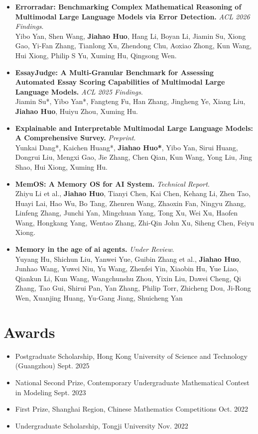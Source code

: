 \documentclass[letterpaper,10pt]{article}
\begin{document}
\begin{itemize}[leftmargin=0.15in, itemsep=1pt, parsep=0pt]
\item \textbf{Errorradar: Benchmarking Complex Mathematical Reasoning of Multimodal Large Language Models via Error Detection.} \emph{ACL 2026 Findings}. \\
  Yibo Yan, Shen Wang, \textbf{Jiahao Huo}, Hang Li, Boyan Li, Jiamin Su, Xiong Gao, Yi-Fan Zhang, Tianlong Xu, Zhendong Chu, Aoxiao Zhong, Kun Wang, Hui Xiong, Philip S Yu, Xuming Hu, Qingsong Wen.

  \item \textbf{EssayJudge: A Multi-Granular Benchmark for Assessing Automated Essay Scoring Capabilities of Multimodal Large Language Models.} \emph{ACL 2025 Findings}. \\
  Jiamin Su*, Yibo Yan*, Fangteng Fu, Han Zhang, Jingheng Ye, Xiang Liu, \textbf{Jiahao Huo}, Huiyu Zhou, Xuming Hu.

  \item \textbf{Explainable and Interpretable Multimodal Large Language Models: A Comprehensive Survey.} \emph{Preprint}. \\
  Yunkai Dang*, Kaichen Huang*, \textbf{Jiahao Huo*}, Yibo Yan, Sirui Huang, Dongrui Liu, Mengxi Gao, Jie Zhang, Chen Qian, Kun Wang, Yong Liu, Jing Shao, Hui Xiong, Xuming Hu.

  \item \textbf{MemOS: A Memory OS for AI System.} \emph{Technical Report}. \\
  Zhiyu Li et al., \textbf{Jiahao Huo}, Tianyi Chen, Kai Chen, Kehang Li, Zhen Tao, Huayi Lai, Hao Wu, Bo Tang, Zhenren Wang, Zhaoxin Fan, Ningyu Zhang, Linfeng Zhang, Junchi Yan, Mingchuan Yang, Tong Xu, Wei Xu, Haofen Wang, Hongkang Yang, Wentao Zhang, Zhi-Qin John Xu, Siheng Chen, Feiyu Xiong.

  \item \textbf{Memory in the age of ai agents.} \emph{Under Review}. \\
  Yuyang Hu, Shichun Liu, Yanwei Yue, Guibin Zhang et al., \textbf{Jiahao Huo}, Junhao Wang, Yuwei Niu, Yu Wang, Zhenfei Yin, Xiaobin Hu, Yue Liao, Qiankun Li, Kun Wang, Wangchunshu Zhou, Yixin Liu, Dawei Cheng, Qi Zhang, Tao Gui, Shirui Pan, Yan Zhang, Philip Torr, Zhicheng Dou, Ji-Rong Wen, Xuanjing Huang, Yu-Gang Jiang, Shuicheng Yan
\end{itemize}

\section{Awards}
\begin{itemize}[leftmargin=0.15in, label={}, itemsep=1pt]
  \small
  \item Postgraduate Scholarship, Hong Kong University of Science and Technology (Guangzhou) \hfill Sept. 2025
  \item National Second Prize, Contemporary Undergraduate Mathematical Contest in Modeling \hfill Sept. 2023
  \item First Prize, Shanghai Region, Chinese Mathematics Competitions \hfill Oct. 2022
  \item Undergraduate Scholarship, Tongji University \hfill Nov. 2022
\end{itemize}
\end{document}
